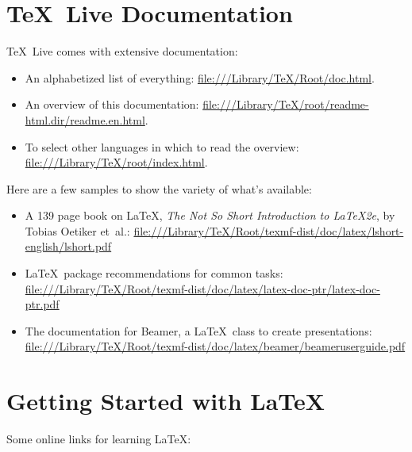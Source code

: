 \documentclass[11pt, oneside]{article}
\begin{document}
\pagestyle{empty}

\section{\TeX\ Live Documentation}

\TeX\ Live comes with extensive documentation:

\begin{itemize}
\item An alphabetized list of everything:
\url{file:///Library/TeX/Root/doc.html}.

\item An overview of this documentation:
\url{file:///Library/TeX/root/readme-html.dir/readme.en.html}.

\item To select other languages in which to read the overview:
\url{file:///Library/TeX/root/index.html}.
\end{itemize}


Here are a few samples to show the variety of what's available:

\begin{itemize}

\item A 139 page book on \LaTeX, \emph {The Not So Short Introduction to
\LaTeX 2e}, by Tobias Oetiker et~al.:
\url{file:///Library/TeX/Root/texmf-dist/doc/latex/lshort-english/lshort.pdf}
     
\item \LaTeX\ package recommendations for common tasks: \url{file:///Library/TeX/Root/texmf-dist/doc/latex/latex-doc-ptr/latex-doc-ptr.pdf}

\item The documentation for Beamer, a \LaTeX\ class to create presentations:
\url{file:///Library/TeX/Root/texmf-dist/doc/latex/beamer/beameruserguide.pdf}

\end{itemize}



\section{Getting Started with \LaTeX}

Some online links for learning \LaTeX:
\end{document}
